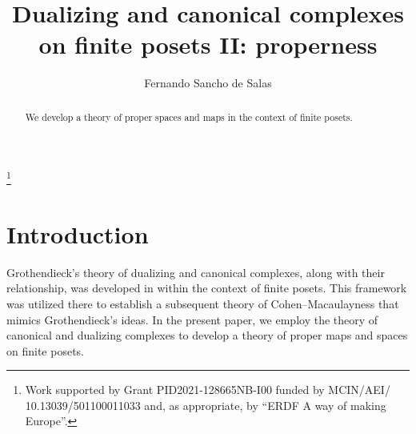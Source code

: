 \documentclass[amssymb,amscd,11pt,20pt]{amsart}
\newcommand{\0}{\mathbf 0}
\theoremstyle{plain}
\numberwithin{equation}{thm}
\begin{document}
\title{Dualizing and canonical complexes on finite posets II: properness}



\author{Fernando Sancho de Salas}

\address{ Departamento de
Matem\'aticas and Instituto Universitario de F\'isica Fundamental y Matem\'aticas (IUFFyM)\newline
Universidad de Salamanca\newline  Plaza de la Merced 1-4\\
37008 Salamanca\newline  Spain}





\thanks {Work supported by Grant PID2021-128665NB-I00 funded by MCIN/AEI/ 10.13039/501100011033 and, as appropriate, by ``ERDF A way of making Europe''.}
 
\begin{abstract}   We develop a theory of proper spaces and maps in the context of finite posets.
\end{abstract}

 \maketitle

\section*{Introduction} 

Grothendieck's theory of dualizing and canonical complexes, along with their relationship, was developed in \cite{ST2} within the context of finite posets. This framework was utilized there to establish a subsequent theory of Cohen--Macaulayness that mimics Grothendieck's ideas. In the present paper, we employ the theory of canonical and dualizing complexes to develop a theory of proper maps and spaces on finite posets.
\end{document}
